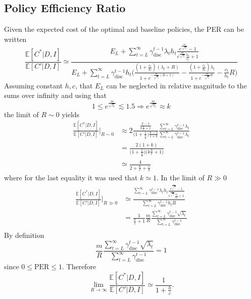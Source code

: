\subsection{Policy Efficiency Ratio}
Given the expected cost of the optimal and baseline policies, the PER can be written
\begin{equation}
	\frac{\mathbb{E}[C^*|D,I] }{\mathbb{E}[C'|D,I]}\simeq \frac{E_L+\sum_{t=L}^{\infty} \gamma_{\text{disc}}^{t-1} \lambda_th_t\frac{e^{\frac{m}{\sqrt{\lambda_t}}}-1}{e^{\frac{m}{\sqrt{\lambda_t}}}\frac{h_t}{c_t}+1}}{E_L+\sum_{t=L}^{\infty} \gamma_{\text{disc}}^{t-1}h_t \bigg( 
		\frac{(1+\frac{c_t}{h_t})(\lambda_t+R)}{1+e^{-\frac{m}{\sqrt{\lambda_t}}(R+1)}}- \frac{(1+\frac{c_t}{h_t})\lambda_t}{1+e^{-\frac{m}{\sqrt{\lambda_t}}R}} - \frac{c_t}{h_t}R\bigg)}
\end{equation}
Assuming constant $h,c$, that $E_L$ can be neglected in relative magnitude to the sums over infinity and using that \begin{equation}
	1\leq e^{\frac{m}{\sqrt{\lambda_t}}}\lesssim 1.5 \Rightarrow  e^{\frac{m}{\sqrt{\lambda_t}}}\approx k
\end{equation}
the limit of $R\sim 0$ yields
\begin{equation}
	\begin{split}
		\frac{\mathbb{E}[C^*|D,I]}{\mathbb{E}[C'|D,I]}\bigg|_{R\sim 0} 
		&\approx 2 \frac{\frac{k-1}{k\frac{h}{c} + 1}}{\big(1 + \frac{1}{\frac{h}{c}}\big)\frac{k-1}{1+k}} \frac{\sum_{t=L}^{\infty} \gamma_{\text{disc}}^{t-1} \lambda_t}{\sum_{t=L}^{\infty} \gamma_{\text{disc}}^{t-1} \lambda_t} \\
		&= \frac{2(1+k)}{\big(1 + \frac{1}{\frac{h}{c}}\big)\big(k\frac{h}{c} + 1\big)} \\
		&\simeq \frac{4}{2 + \frac{h}{c} + \frac{c}{h}}
	\end{split}
\end{equation}
where for the last equality it was used that $k\simeq 1$. In the limit of $R\gg 0$
\begin{equation}
	\begin{split}
		\frac{\mathbb{E}[C^*|D,I] }{\mathbb{E}[C'|D,I]}\bigg|_{R\gg 0} &\simeq \frac{\sum_{t=L}^{\infty} \gamma_{\text{disc}}^{t-1} \lambda_th_t\frac{e^{\frac{m}{\sqrt{\lambda_t}}}-1}{e^{\frac{m}{\sqrt{\lambda_t}}}\frac{h_t}{c_t}+1}}{\sum_{t=L}^{\infty} \gamma_{\text{disc}}^{t-1}h_t R} \\
		&=\frac{1}{\frac{h}{c}+1} \frac{m}{R}\frac{\sum_{t=L}^{\infty} \gamma_{\text{disc}}^{t-1} \sqrt{\lambda_t}}{\sum_{t=L}^{\infty} \gamma_{\text{disc}}^{t-1}} \\
	\end{split}
\end{equation}
By definition
\begin{equation}
	\frac{m}{R}\frac{\sum_{t=L}^{\infty} \gamma_{\text{disc}}^{t-1} \sqrt{\lambda_t}}{\sum_{t=L}^{\infty} \gamma_{\text{disc}}^{t-1}} = 1 
\end{equation}
since $0\leq \text{PER}\leq 1$. Therefore
\begin{equation}
	\lim\limits_{R\rightarrow \infty}\frac{\mathbb{E}[C^*|D,I] }{\mathbb{E}[C'|D,I]} \simeq \frac{1}{1+\frac{h}{c}}.
\end{equation}